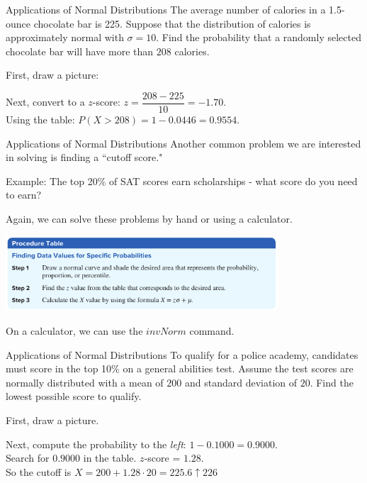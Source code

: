 \documentclass[t, aspectratio=169]{beamer}
\newcommand{\?}{\stackrel{?}{=}}
\begin{document}
	\begin{frame}{Applications of Normal Distributions}
		The average number of calories in a 1.5-ounce chocolate bar is 225. Suppose that the distribution of calories is approximately normal with $\sigma = 10$. Find the probability that a randomly selected chocolate bar will have more than $208$ calories. \pause
		
		First, draw a picture: \vspace{1in} \pause
		
		Next, convert to a $z$-score: $z = \dfrac{208 - 225}{10} = -1.70$. \\ \pause
		Using the table: $P(X > 208) = 1 - 0.0446 = 0.9554$.
	\end{frame}

	\begin{frame}{Applications of Normal Distributions}
		Another common problem we are interested in solving is finding a ``cutoff score." \pause
		
		Example: The top 20\% of SAT scores earn scholarships - what score do you need to earn? \pause
		
		Again, we can solve these problems by hand or using a calculator. \pause
		
		\includegraphics[width=4in]{norm-cutoff-proc.png} \pause
		
		On a calculator, we can use the $invNorm$ command.
	\end{frame}

	\begin{frame}{Applications of Normal Distributions}
		To qualify for a police academy, candidates must score in the top 10\% on a general abilities test. Assume the test scores are normally distributed with a mean of $200$ and standard deviation of $20$. Find the lowest possible score to qualify. \pause
		
		First, draw a picture. \vspace{1in} \pause
		
		Next, compute the probability to the \textit{left}: $1 - 0.1000 = 0.9000$. \pause \\
		Search for $0.9000$ in the table. \pause $z$-score = $1.28$. \pause \\
		So the cutoff is $X = 200 + 1.28\cdot 20 = 225.6 \uparrow 226$
	\end{frame}
\end{document}
